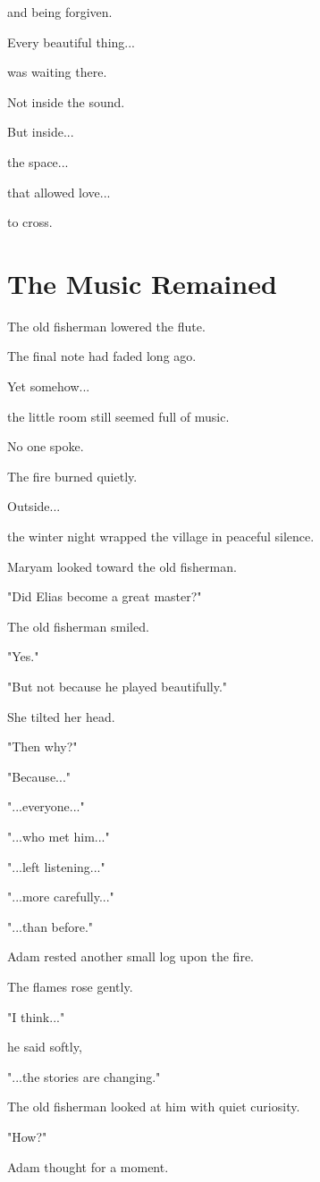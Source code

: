 \documentclass[12pt,openany]{book}
\begin{document}
and being forgiven.

Every beautiful thing...

was waiting there.

Not inside the sound.

But inside...

the space...

that allowed love...

to cross.
\section*{The Music Remained}

The old fisherman lowered the flute.

The final note had faded long ago.

Yet somehow...

the little room still seemed full of music.

No one spoke.

The fire burned quietly.

Outside...

the winter night wrapped the village in peaceful silence.

Maryam looked toward the old fisherman.

"Did Elias become a great master?"

The old fisherman smiled.

"Yes."

"But not because he played beautifully."

She tilted her head.

"Then why?"

"Because..."

"...everyone..."

"...who met him..."

"...left listening..."

"...more carefully..."

"...than before."

Adam rested another small log upon the fire.

The flames rose gently.

"I think..."

he said softly,

"...the stories are changing."

The old fisherman looked at him with quiet curiosity.

"How?"

Adam thought for a moment.
\end{document}
